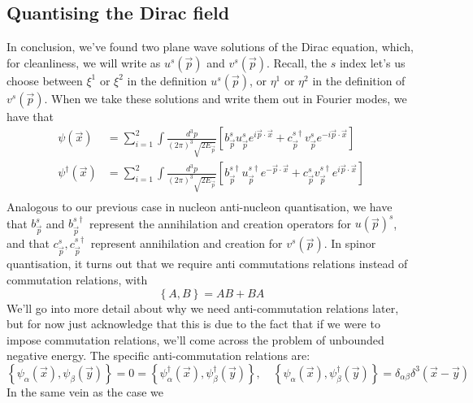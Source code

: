 \subsection{Quantising the Dirac field}
In conclusion, we've found two 
plane wave solutions of the Dirac equation, which, for 
cleanliness, we will write as 
$ u ^ s (\vec{p} )  $ and $ v ^s ( \vec{p} )$. 
Recall, the $ s $ index let's us choose between 
$ \xi ^ 1  $  or $ \xi ^ 2 $ in the definition $ u^ s ( \vec{p} )$, 
or $ \eta ^ 1 $ or $ \eta ^ 2 $ in the definition of $  v ^ s ( \vec{p} ) $.  
When we take these solutions and write them out 
in Fourier modes, we have that 
\begin{align*}
\psi ( \vec{x} ) &=  \sum _{ i = 1 } ^ 2 
\int \frac{ d^ 3 p }{ ( 2 \pi ) ^ 3 \sqrt{ 2 E_{ \vec{p} } }  } \left[  
b_{ \vec{p} } ^ s u _{ \vec{p} } ^ s e ^{ i \vec{p} \cdot  \vec{x} } 
+ c_{ \vec{p} } ^{ s \dagger } v_{ \vec{p} } ^ s e ^{ - i \vec{p} \cdot  \vec{x}}\right] \\
\psi ^ \dagger ( \vec{x} ) &=  \sum _{ i = 1 } ^ 2 
\int \frac{ d ^ 3 p }{ ( 2 \pi ) ^ 3 \sqrt{ 2 E _{ \vec{p} } }  } \left[  
	b_{ \vec{p} } ^ { s \dagger }  u_{\vec{p} } ^{ s \dagger } e ^{ - \vec{p} \cdot  \vec{x} } + 
c_{ \vec{p} } ^ s v_{ \vec{p}} ^{ s \dagger } e ^{ i \vec{p} \cdot  \vec{x} } \right] \\ 
\end{align*}
Analogous to our previous case in 
nucleon anti-nucleon quantisation, we have that
$ b_{\vec{p} }^ s $  and $ b_{\vec{p} } ^{ s \dagger } $ 
represent the annihilation and creation 
operators for $ u( \vec{p} ) ^ s $, and that $  c_{ \vec{p} } ^ s , 
c_{ \vec{p} } ^{ s \dagger } $  represent annihilation 
and creation for $ v ^ s ( \vec{p} ) $. 
In spinor quantisation, it turns out that we require 
anti commutations relations instead of commutation relations, with 
\[
\left\{  A, B  \right\}   = AB + B A 
\] We'll go into more detail about why we 
need anti-commutation relations later, 
but for now just acknowledge that this is due to the fact that 
if we were to impose commutation relations, 
we'll come across the problem of unbounded negative energy. 
The specific anti-commutation relations are:  
\[
\left\{  \psi _ \alpha ( \vec{x} ) , \psi _ \beta ( \vec{y} )  \right\}   = 0 
= \left\{  \psi _{ \alpha } ^ \dagger ( \vec{x} ) , \psi _{ \beta } ^ \dagger 
( \vec{y} ) \right\}  , \quad \left\{  \psi _ \alpha ( \vec{x} ) , 
\psi _{ \beta }^\dagger ( \vec{y} ) \right\}  = \delta _{ \alpha \beta } \delta ^ 3 ( \vec{x} - \vec{y} ) 
\]
In the same vein as the case we 
